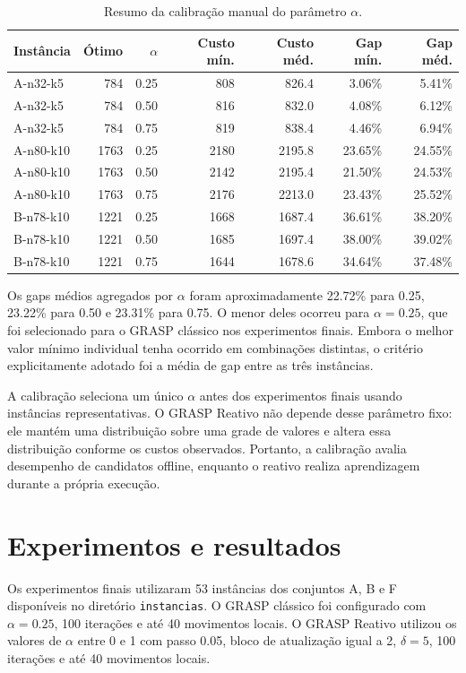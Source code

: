 \documentclass[12pt]{article}
\begin{document}
\begin{table}[!htbp]
\centering
\caption{Resumo da calibração manual do parâmetro $\alpha$.}
\label{tab:calibracao}
\small
\begin{tabular}{lrrrrrr}
\toprule
Instância & Ótimo & $\alpha$ & Custo mín. & Custo méd. & Gap mín. & Gap méd. \\
\midrule
A-n32-k5 & 784 & 0.25 & 808 & 826.4 & 3.06\% & 5.41\% \\
A-n32-k5 & 784 & 0.50 & 816 & 832.0 & 4.08\% & 6.12\% \\
A-n32-k5 & 784 & 0.75 & 819 & 838.4 & 4.46\% & 6.94\% \\
A-n80-k10 & 1763 & 0.25 & 2180 & 2195.8 & 23.65\% & 24.55\% \\
A-n80-k10 & 1763 & 0.50 & 2142 & 2195.4 & 21.50\% & 24.53\% \\
A-n80-k10 & 1763 & 0.75 & 2176 & 2213.0 & 23.43\% & 25.52\% \\
B-n78-k10 & 1221 & 0.25 & 1668 & 1687.4 & 36.61\% & 38.20\% \\
B-n78-k10 & 1221 & 0.50 & 1685 & 1697.4 & 38.00\% & 39.02\% \\
B-n78-k10 & 1221 & 0.75 & 1644 & 1678.6 & 34.64\% & 37.48\% \\
\bottomrule
\end{tabular}
\end{table}

Os gaps médios agregados por $\alpha$ foram aproximadamente 22.72\% para 0.25, 23.22\% para 0.50 e 23.31\% para 0.75. O menor deles ocorreu para $\alpha=0.25$, que foi selecionado para o GRASP clássico nos experimentos finais. Embora o melhor valor mínimo individual tenha ocorrido em combinações distintas, o critério explicitamente adotado foi a média de gap entre as três instâncias.

A calibração seleciona um único $\alpha$ antes dos experimentos finais usando instâncias representativas. O GRASP Reativo não depende desse parâmetro fixo: ele mantém uma distribuição sobre uma grade de valores e altera essa distribuição conforme os custos observados. Portanto, a calibração avalia desempenho de candidatos offline, enquanto o reativo realiza aprendizagem durante a própria execução.

\section{Experimentos e resultados}

Os experimentos finais utilizaram 53 instâncias dos conjuntos A, B e F disponíveis no diretório \texttt{instancias}. O GRASP clássico foi configurado com $\alpha=0.25$, 100 iterações e até 40 movimentos locais. O GRASP Reativo utilizou os valores de $\alpha$ entre 0 e 1 com passo 0.05, bloco de atualização igual a 2, $\delta=5$, 100 iterações e até 40 movimentos locais.
\end{document}
